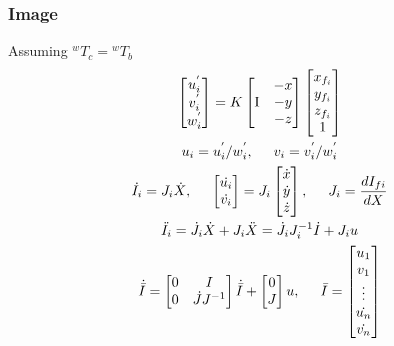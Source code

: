 \documentclass{paper}
\begin{document}
\subsubsection{Image}
Assuming ${}^{w}T_{c} = {}^{w}T_{b}$ 
\begin{gather}
\begin{bmatrix} u_{i}^{'}\\v_{i}^{'}\\w_{i}^{'} \end{bmatrix} = K\begin{bmatrix} \mbox{I}&\begin{matrix} -x\\-y\\-z \end{matrix}\end{bmatrix}\begin{bmatrix} x_{f_{i}}\\y_{f_{i}}\\z_{f_{i}}\\1 \end{bmatrix} \\
u_{i} = u_{i}^{'}/w_{i}^{'}, \hspace*{5mm} v_{i}=v_{i}^{'}/w_{i}^{'}\\
\dot{I_{i}} = J_{i} \dot{X},\hspace*{5mm}
\begin{bmatrix} \dot{u_{i}}\\\dot{v_{i}} \end{bmatrix} = J_{i}\begin{bmatrix} \dot{x}\\\dot{y}\\\dot{z}\end{bmatrix},\hspace*{5mm}
J_{i} = \frac{dI_{f{i}}}{dX} \\
\ddot{I_{i}} = \dot{J_{i}}\dot{X} + J_{i}\ddot{X} = \dot{J_{i}}J_{i}^{-1}\dot{I} + J_{i} u\\
\dot{\bar{I}} = \begin{bmatrix} 0 & I \\ 0 & \dot{J}J^{-1}\end{bmatrix}\dot{\bar{I}} + \begin{bmatrix} 0\\J\end{bmatrix}u,\hspace*{5mm}
\bar{I} = \begin{bmatrix}u_{1}\\ v_{1}\\\vdots\\ \dot{u_{n}}\\\dot{v_{n}} \end{bmatrix}
\end{gather}
\end{document}

